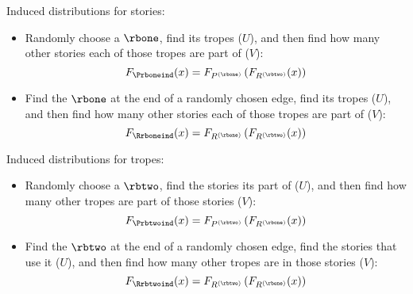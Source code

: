 \begin{frame}

  \begin{block}{Induced distributions for stories:}
    \begin{itemize}
    \item<+->
      Randomly choose a $\rbone$, find its tropes ($U$),
      and then find how many other stories each of those tropes 
      are part of ($V$):
      $$
      F_{\Prboneind}(x)
      =
      F_{P^{(\rbone)}}
      \left(
        F_{R^{(\rbtwo)}}(x)      
      \right)
      $$
    \item<+->
      Find the $\rbone$ at the end of a randomly chosen edge, find its tropes ($U$),
      and then find how many other stories each of those tropes 
      are part of ($V$):
      $$
      F_{\Rrboneind}(x)
      =
      F_{R^{(\rbone)}}
      \left(
        F_{R^{(\rbtwo)}}(x)      
      \right)
      $$
    \end{itemize}
  \end{block}

\end{frame}

\begin{frame}

  \begin{block}{Induced distributions for tropes:}
    \begin{itemize}
    \item<+->
      Randomly choose a $\rbtwo$, find the stories its part of ($U$),
      and then find how many other tropes are part of those stories ($V$):
      $$
      F_{\Prbtwoind}(x)
      =
      F_{P^{(\rbtwo)}}
      \left(
        F_{R^{(\rbone)}}(x)      
      \right)
      $$
    \item<+->
      Find the $\rbtwo$ at the end of a randomly chosen edge, 
      find the
      stories that use it ($U$),
      and then find how many other tropes are in those stories
      ($V$):
      $$
      F_{\Rrbtwoind}(x)
      =
      F_{R^{(\rbtwo)}}
      \left(
        F_{R^{(\rbone)}}(x)      
      \right)
      $$
    \end{itemize}
  \end{block}

\end{frame}


